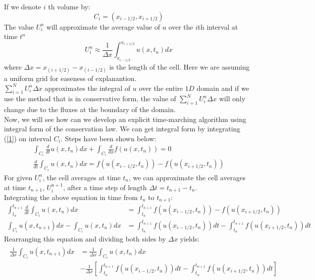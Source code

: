 \documentclass{article}
\begin{document}
If we denote $i$ th volume by:
\begin{equation}
C_i = (x_{i-1/2},x_{i+1/2})
\end{equation}
The value $U^n_i$ will approximate the average value of $u$ over the $i$th interval at time $t^n$
\begin{equation}
U_i^n \approx \frac{1}{\Delta x}\int_{x_{i-1/2}}^{x_{i+1/2}} u(x, t_n) dx
\end{equation}
where $\Delta x=x_(i+1/2)-x_(i-1/2 )$ is the length of the cell. Here we are assuming a uniform grid for easeness of explanantion.\\
$\sum_{i=1}^N U_i^n \Delta x$ approximates the integral of $u$ over the entire $1D$ domain and if we use the method that is in conservative form, the value of $\sum_{i=1}^N U^n_i \Delta x$ will only change due to the fluxes at the boundary of the domain.\\
Now, we will see how can we develop an explicit time-marching algorithm using integral form of the conservation law. We can get integral form by integrating (\ref{1}) on interval $C_i$. Steps have been shown below:
\begin{gather*}
\int_{C_i}\frac{d}{dt} u(x,t_n) dx +\int_{C_i} \frac{d}{dx} f(u(x,t_n)) = 0 \\
\frac{d}{dt}\int_{C_i}u(x, t_n)dx =  f(u(x_{i-1/2}, t_n)) - f(u(x_{i+1/2},t_n))
\end{gather*}
For given $U_i^n$, the cell averages at time $t_n$, we can approximate the cell averages at time $t_{n+1}$, $U_i^{n+1}$, after a time step of length $\Delta t = t_{n+1} - t_n$. \\
Integrating the above equation in time from $t_n$ to $t_{n+1}$:
\begin{align*}
\int_{t_n}^{t_{n+1}} \frac{d}{dt} \int_{C_i} u(x, t_n) dx &= \int_{t_n}^{t_{n+1}} f(u(x_{i-1/2}, t_n)) - f(u(x_{i+1/2}, t_n)) \\
\int_{C_i} u(x, t_{n+1})dx - \int_{C_i} u(x, t_n)dx &=  \int_{t_n}^{t_{n+1}} f(u(x_{i-1/2}, t_n)) dt - \int_{t_n}^{t_{n+1}} f(u(x_{i+1/2}, t_n)) dt
\end{align*}
Rearranging this equation and dividing both sides by $\Delta x$ yields:
\begin{align} \label{4}
\begin{split}
\frac{1}{\Delta x} \int_{C_i} u(x, t_{n+1}) dx &= \frac{1}{\Delta x} \int_{C_i} u(x, t_n) dx \\ &- \frac{1}{\Delta x} \left[ \int_{t_n}^{t_{n+1}} f(u(x_{i-1/2}, t_n)) dt -  \int_{t_n}^{t_{n+1}} f(u(x_{i+1/2}, t_n)) dt \right]
\end{split}
\end{align}
\end{document}
